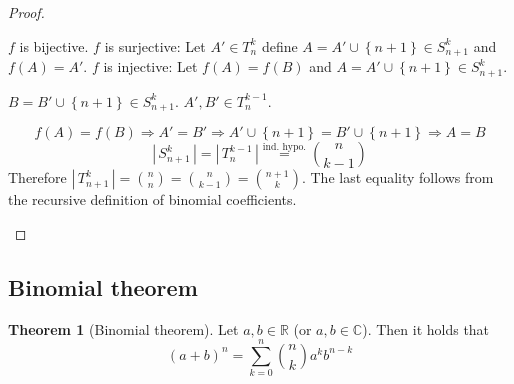 \documentclass[a4paper,landscape,twocolumn]{article}
\theoremstyle{definition}
\newtheorem{theorem}{Theorem}
\newcommand\set[1]{\left\{#1\right\}}
\newcommand\card[1]{\left|\,#1\,\right|}
\begin{document}
\begin{proof}
\begin{description}
      $f$ is bijective.
      $f$ is surjective: Let $A' \in T_n^k$ define $A = A' \cup \set{n+1} \in S_{n+1}^k$ and $f(A) = A'$.
      $f$ is injective: Let $f(A) = f(B)$ and $A = A' \cup \set{n+1} \in S_{n+1}^k$.

      $B = B' \cup \set{n+1} \in S_{n+1}^k$. $A', B' \in T_n^{k-1}$.

      \[ f(A) = f(B) \Rightarrow A' = B' \Rightarrow A' \cup \set{n+1} = B' \cup \set{n+1} \Rightarrow A = B \]
      \[ \card{S_{n+1}^k} = \card{T_n^{k-1}} \stackrel{\text{ind. hypo.}}{=} \binom{n}{k-1} \]
      Therefore $\card{T_{n+1}^k} = \binom nn = \binom n{k-1} = \binom{n+1}{k}$.
      The last equality follows from the recursive definition of binomial coefficients.
  \end{description}
\end{proof}

\subsection{Binomial theorem}
\begin{theorem}[Binomial theorem]
  Let $a, b \in \mathbb{R}$ (or $a, b \in \mathbb{C}$). Then it holds that
  \[ (a + b)^n = \sum_{k=0}^n \binom{n}{k} a^k b^{n-k} \]
\end{theorem}
\end{document}
